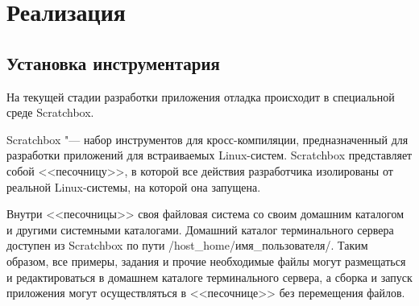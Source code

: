 \newpage
\chapter{Реализация}\label{ch:chapter_2}

\section{Установка инструментария}

На текущей стадии разработки приложения отладка происходит в специальной среде Scratchbox.

Scratchbox "--- набор инструментов для кросс-компиляции, предназначенный для разработки приложений для встраиваемых Linux-систем. Scratchbox представляет собой <<песочницу>>, в которой все действия разработчика изолированы от реальной Linux-системы, на которой она запущена.

Внутри <<песочницы>> своя файловая система со своим домашним каталогом и другими системными каталогами. Домашний каталог терминального сервера доступен из Scratchbox по пути /host\_home/имя\_пользователя/. Таким образом, все примеры, задания и прочие необходимые файлы могут размещаться и редактироваться в домашнем каталоге терминального сервера, а сборка и запуск приложения могут осуществляться в <<песочнице>> без перемещения файлов.

